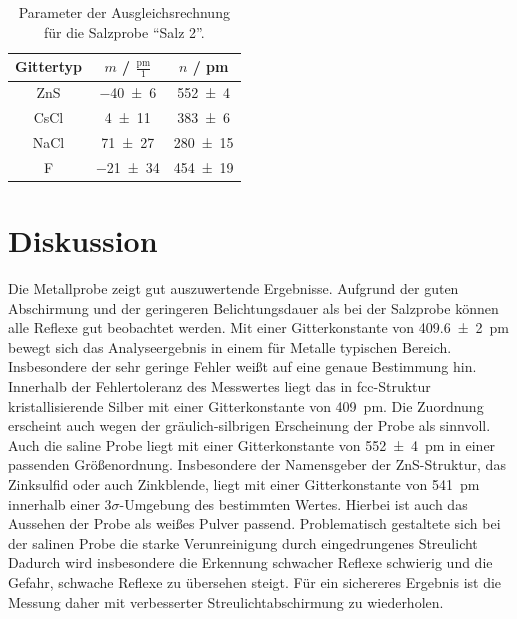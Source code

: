 \begin{table}[H]
  \centering
  \caption{Parameter der Ausgleichsrechnung für die Salzprobe \enquote{Salz 2}.}
  \label{Tab:Salz_Regression}
  \begin{tabular}{c | c c }
    \toprule
    Gittertyp &
    $m$ / $\frac{\mathrm{pm}}{1}$ &
    $n$ / pm \\
    \midrule
    ZnS & \num{-40(6)} & \num{552(4)} \\
    CsCl & \num{4(11)} & \num{383(6)} \\
    NaCl & \num{71(27)} & \num{280(15)} \\
    F & \num{-21(34)} & \num{454(19)} \\
    \bottomrule
  \end{tabular}
\end{table}

\section{Diskussion}
Die Metallprobe zeigt gut auszuwertende Ergebnisse. Aufgrund der guten Abschirmung
und der geringeren Belichtungsdauer als bei der Salzprobe können alle Reflexe gut
beobachtet werden. Mit einer Gitterkonstante von \SI{409.6(20)}{\pico\metre}
bewegt sich das Analyseergebnis in einem für Metalle typischen Bereich.
Insbesondere der sehr geringe Fehler weißt auf eine genaue Bestimmung hin.
Innerhalb der Fehlertoleranz des Messwertes liegt das in fcc-Struktur kristallisierende
Silber mit einer Gitterkonstante von \SI{409}{\pico\metre}\cite{AM}. Die Zuordnung erscheint
auch wegen der gräulich-silbrigen Erscheinung der Probe als sinnvoll.\\
Auch die saline Probe liegt mit einer Gitterkonstante von \SI{552(4)}{\pico\metre}
in einer passenden Größenordnung. Insbesondere der Namensgeber der ZnS-Struktur,
das Zinksulfid oder auch Zinkblende, liegt mit einer Gitterkonstante von
\SI{541}{\pico\metre}\cite{AM} innerhalb einer $3\sigma$-Umgebung des bestimmten Wertes.
Hierbei ist auch das Aussehen der Probe als weißes Pulver passend.
Problematisch gestaltete sich bei der salinen Probe die starke Verunreinigung
durch eingedrungenes Streulicht Dadurch wird insbesondere die Erkennung schwacher
Reflexe schwierig und die Gefahr, schwache Reflexe zu übersehen steigt.
Für ein sichereres Ergebnis ist die Messung daher mit verbesserter Streulichtabschirmung
zu wiederholen.
